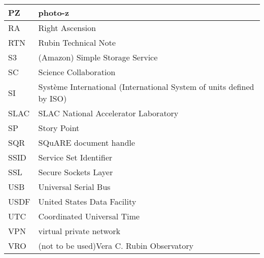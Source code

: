 \begin{longtable}{p{}p{}}
PZ & photo-z \\\hline
RA & Right Ascension \\\hline
RTN & Rubin Technical Note \\\hline
S3 & (Amazon) Simple Storage Service \\\hline
SC & Science Collaboration \\\hline
SI & Syst\`eme International (International System of units defined by ISO) \\\hline
SLAC & SLAC National Accelerator Laboratory \\\hline
SP & Story Point \\\hline
SQR & SQuARE document handle \\\hline
SSID & Service Set Identifier \\\hline
SSL & Secure Sockets Layer \\\hline
USB & Universal Serial Bus \\\hline
USDF & United States Data Facility \\\hline
UTC & Coordinated Universal Time \\\hline
VPN & virtual private network \\\hline
VRO & (not to be used)Vera C. Rubin Observatory \\\hline
\end{longtable}
